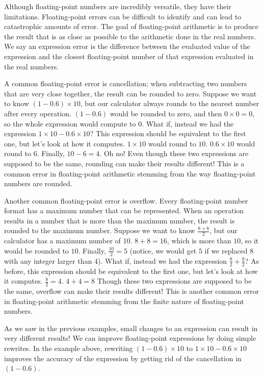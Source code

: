 \documentclass[11pt]{article}
\begin{document}
Although floating-point numbers are incredibly versatile, they have their
  limitations.
Floating-point errors can be difficult to identify and can lead to catastrophic
  amounts of error.
The goal of floating-point arithmetic is to produce the result that is as close
  as possible to the arithmetic done in the real numbers.
We say an expression error is the difference between the evaluated value of the
  expression and the closest floating-point number of that expression evaluated
  in the real numbers.


A common floating-point error is cancellation; when subtracting two numbers that are very
  close together, the result can be rounded to zero.
Suppose we want to know $(1 - 0.6) \times 10$, but our calculator always rounds to 
  the nearest number after every operation.
$(1 - 0.6)$ would be rounded to zero, and then $0 \times 0 = 0$, so the whole
  expression would compute to $0$.
What if, instead we had the expression $1 \times 10 - 0.6 \times 10$?
This expression should be equivalent to the first one, but let's look at how it computes.
$1 \times 10$ would round to $10$.
$0.6 \times 10$ would round to $6$.
Finally, $10 - 6 = 4$.
Oh no!
Even though these two expressions are supposed to be the same, rounding can make their
  results different!
This is a common error in floating-point arithmetic stemming from the way
  floating-point numbers are rounded.

Another common floating-point error is overflow.
Every floating-point number format has a maximum number that can be represented.
When an operation results in a number that is more than the maximum number, the result
  is rounded to the maximum number.
Suppose we want to know $\frac{8 + 8}{2}$, but our calculator has a maximum number of $10$.
$8 + 8 = 16$, which is more than $10$, so it would be rounded to $10$.
Finally, $\frac{10}{2} = 5$ (notice, we would get $5$ if we replaced $8$ with any integer larger than $4$).
What if, instead we had the expression $\frac{8}{2} + \frac{8}{2}$?
As before, this expression should be equivalent to the first one, but let's look at how it computes.
$\frac{8}{2} = 4$.
$4 + 4 = 8$ 
Though these two expressions are supposed to be the same, overflow can make their
  results different!
This is another common error in floating-point arithmetic stemming from the finite nature of
  floating-point numbers.

As we saw in the previous examples, small changes to an expression can result
  in very different results!
We can improve floating-point expressions by doing simple rewrites.
In the example above, rewriting $(1 - 0.6) \times 10$ to 
  $1 \times 10 - 0.6 \times 10$ improves the accuracy of
  the expression by getting rid of the cancellation in $(1 - 0.6)$.
\end{document}
